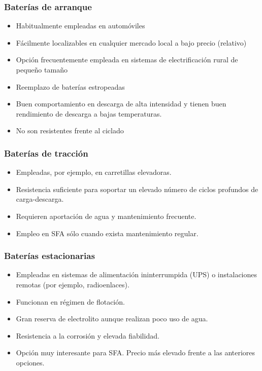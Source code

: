 \documentclass[serif, xcolor=dvipsnames]{beamer}
\begin{document}
\begin{frame}
\frametitle{Baterías de arranque}
\begin{block}
{}
\begin{itemize}
\item Habitualmente empleadas en automóviles
\item Fácilmente localizables en cualquier mercado local a bajo precio (relativo)
\item Opción frecuentemente empleada en sistemas de electrificación rural
de pequeño tamaño
\item Reemplazo de baterías estropeadas
\item Buen comportamiento en descarga de alta intensidad y tienen buen rendimiento
de descarga a bajas temperaturas. 
\item No son resistentes frente al ciclado
\end{itemize}
\end{block}

\end{frame}

\begin{frame}
\frametitle{Baterías de tracción}
\begin{block}
{}
\begin{itemize}
\item Empleadas, por ejemplo, en carretillas elevadoras. 
\item Resistencia suficiente para soportar un elevado número de ciclos profundos
de carga-descarga. 
\item Requieren aportación de agua y mantenimiento frecuente.
\item Empleo en SFA sólo cuando exista mantenimiento regular.
\end{itemize}
\end{block}

\end{frame}

\begin{frame}
\frametitle{Baterías estacionarias}
\begin{block}
{}
\begin{itemize}
\item Empleadas en sistemas de alimentación ininterrumpida (UPS) o instalaciones
remotas (por ejemplo, radioenlaces). 
\item Funcionan en régimen de flotación. 
\item Gran reserva de electrolito aunque realizan poco uso de agua. 
\item Resistencia a la corrosión y elevada fiabilidad.
\item Opción muy interesante para SFA. Precio más elevado frente a las anteriores
opciones.
\end{itemize}
\end{block}

\end{frame}
\end{document}
